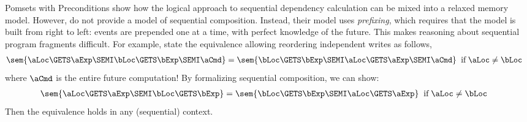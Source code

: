 Pomsets with Preconditions show how the logical approach to sequential
dependency calculation can be mixed into a relaxed memory model.  However,
\citeauthor{DBLP:journals/pacmpl/JagadeesanJR20} do not provide a model of
sequential composition.  Instead, their model uses \emph{prefixing}, which
requires that the model is built from right to left: events are prepended one
at a time, with perfect knowledge of the future.  This makes reasoning about
sequential program fragments difficult.  For example,
\citeauthor{DBLP:journals/pacmpl/JagadeesanJR20} state the equivalence
allowing reordering independent writes as follows,
\begin{align*}
  \sem{\aLoc \GETS \aExp \SEMI \bLoc  \GETS \bExp\SEMI\aCmd} &=
  \sem{\bLoc  \GETS \bExp\SEMI \aLoc \GETS \aExp\SEMI\aCmd} \;\;\text{if}\; \aLoc\neq\bLoc
\end{align*}
where $\aCmd$ is the entire future computation!  By formalizing sequential
composition, we can show:
\begin{align*}
  \sem{\aLoc \GETS \aExp \SEMI \bLoc  \GETS \bExp} &=
  \sem{\bLoc  \GETS \bExp\SEMI \aLoc \GETS \aExp} \;\;\text{if}\; \aLoc\neq\bLoc
\end{align*}
Then the equivalence holds in any (sequential) context.



%   

